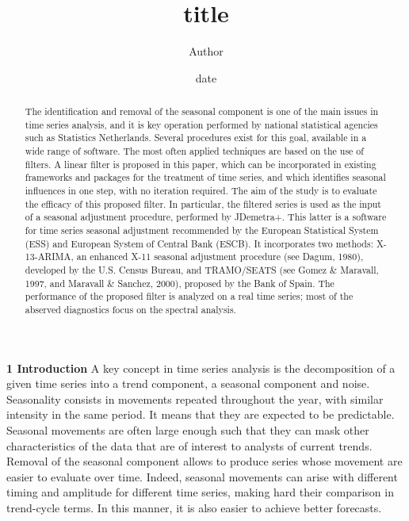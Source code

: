 \documentclass{article}
\title{title}
\author{Author}
\date{date}
\begin{document}
\maketitle
\bigskip
\begin{abstract} The identification and removal of the seasonal component is one of the main issues in time series analysis, and it is key operation performed by national statistical agencies such as Statistics Netherlands. Several procedures exist for this goal, available in a wide range of software. The most often applied techniques are based on the use of filters.  A linear filter is proposed in this paper, which can be incorporated in existing frameworks and packages for the treatment of time series, and which identifies seasonal influences in one step, with no iteration required. The aim of the study is to evaluate the efficacy of this proposed filter. In particular, the filtered series is used as the input of a seasonal adjustment procedure, performed by JDemetra+. This latter is a software for time series seasonal adjustment recommended by the European Statistical System (ESS) and European System of Central Bank (ESCB). It incorporates two methods: X-13-ARIMA, an enhanced X-11 seasonal adjustment procedure (see Dagum, 1980), developed by the U.S. Census Bureau, and TRAMO/SEATS (see Gomez \& Maravall, 1997, and Maravall \& Sanchez, 2000), proposed by the Bank of Spain. The performance of the proposed filter is analyzed on a real time series; most of the abserved diagnostics focus on the spectral analysis.
\end{abstract}
\bigskip
\textbf{1 Introduction} A key concept in time series analysis is the decomposition of a given time series into a trend component, a seasonal component and noise. Seasonality consists in movements repeated throughout the year, with similar intensity in the same period. It means that they are expected to be predictable. Seasonal movements are often large enough such that they can mask other characteristics of the data that are of interest to analysts of current trends. Removal of the seasonal component allows to produce series whose movement are easier to evaluate over time. Indeed, seasonal movements can arise with different timing and amplitude for different time series, making hard their comparison in trend-cycle terms. In this manner, it is also easier to achieve better forecasts.\\
\end{document}
